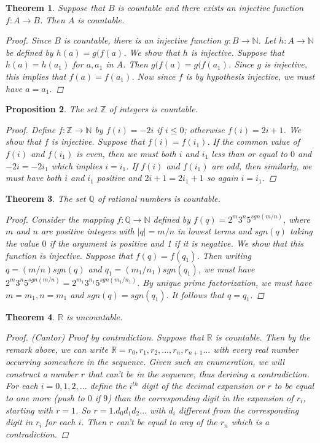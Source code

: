 \documentclass[11pt,a4paper]{report}
\theoremstyle{plain}
\newtheorem{thm}{Theorem}[section]
\newtheorem{prop}[thm]{Proposition}
\theoremstyle{definition}
\theoremstyle{remark}
\begin{document}
\begin{thm}
Suppose that $B$ is countable and there exists an injective function $f \colon A \to B$.  Then $A$ is countable.
\begin{proof}
Since $B$ is countable, there is an injective function $g \colon B \to \mathbb{N}$.  Let $h \colon A \to \mathbb{N}$ be defined by $h(a) = g(f(a)$.  We show that $h$ is injective. Suppose that $h(a) = h(a_1)$ for $a, a_1$ in $A$.  Then $g(f(a) = g(f(a_1)$.  Since $g$ is injective, this implies that $f(a) = f(a_1)$.  Now since $f$ is by hypothesis injective, we must have $a = a_1$.
\end{proof}
\end{thm}
\begin{prop}
The set $\mathbb{Z}$ of integers is countable.
\begin{proof}
Define $f \colon \mathbb{Z} \to \mathbb{N}$ by $f(i) = -2i$ if $i \leq 0$; otherwise $f(i) = 2i + 1$. We show that $f$ is injective.  Suppose that $f(i) = f(i_1)$.  If the common value of $f(i)$ and $f(i_1)$ is even, then we must both $i$ and $i_1$ less than or equal to $0$ and $-2i = -2i_1$ which implies $i = i_1$.  If $f(i)$ and $f(i_1)$ are odd, then similarly, we must have both $i$ and $i_1$ positive and $2i +1 = 2i_1 + 1$ so again $i = i_1$.
\end{proof}
\end{prop}
\begin{thm}
The set $\mathbb{Q}$ of rational numbers is countable.
\begin{proof}
Consider the mapping $f \colon \mathbb{Q} \to \mathbb{N}$ defined by $f(q) = 2^m3^n5^{sgn(m/n)}$, where $m$ and $n$ are positive integers with $|q| = m/n$ in lowest terms and $sgn(q)$ taking the value $0$ if the argument is positive and 1 if it is negative.  We show that this function is injective.  Suppose that $f(q) = f(q_1)$.  Then writing $q = (m/n)sgn(q)$ and $q_1 = (m_1/n_1)sgn(q_1)$, we must have  $2^m3^n5^{sgn(m/n)} = 2^{m_1}3^{n_1}5^{sgn(m_1/n_1)}$. By unique prime factorization, we must have $m = m_1, n=m_1$ and $sgn(q) = sgn(q_1).$  It follows that $q = q_1$.
\end{proof}
\end{thm}
\begin{thm}
$\mathbb{R}$ is uncountable.
\begin{proof}{(Cantor)} Proof by contradiction.  Suppose that $\mathbb{R}$ is countable.  Then by the remark above, we can write $\mathbb{R} = r_0, r_1, r_2, ..., r_n, r_{n+1} ...$ with every real number occurring somewhere in the sequence.  Given such an enumeration, we will construct a number $r$ that can't be in the sequence, thus deriving a contradiction.  For each $i = 0, 1, 2, ... $ define the $i^{th}$ digit of the decimal expansion or $r$ to be equal to one more (push to $0$ if $9$)  than the corresponding digit in the expansion of $r_i$, starting with $r = 1$.  So $r = 1.d_0d_1d_2...$ with $d_i$ different from the corresponding digit in $r_i$ for each $i$. Then $r$ can't be equal to any of the $r_n$ which is a contradiction.
\end{proof}
\end{thm}
\end{document}
